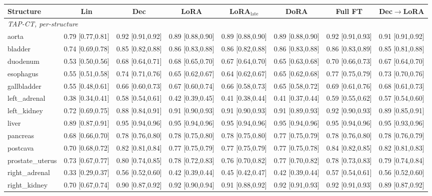 \begin{tabular}{lccccccc}
\toprule
Structure & Lin & Dec & LoRA & LoRA$_{\text{late}}$ & DoRA & Full FT & Dec$\to$LoRA \\
\midrule
\multicolumn{8}{l}{\textit{TAP-CT, per-structure}} \\
aorta & 0.79 [0.77,0.81] & 0.92 [0.91,0.92] & 0.89 [0.88,0.90] & 0.89 [0.88,0.90] & 0.89 [0.88,0.90] & 0.92 [0.91,0.93] & 0.91 [0.91,0.92] \\
bladder & 0.74 [0.69,0.78] & 0.85 [0.82,0.88] & 0.86 [0.83,0.88] & 0.86 [0.82,0.88] & 0.86 [0.83,0.88] & 0.86 [0.83,0.89] & 0.85 [0.81,0.88] \\
duodenum & 0.53 [0.50,0.56] & 0.68 [0.64,0.71] & 0.68 [0.65,0.70] & 0.67 [0.64,0.70] & 0.65 [0.63,0.68] & 0.70 [0.66,0.73] & 0.67 [0.64,0.70] \\
esophagus & 0.55 [0.51,0.58] & 0.74 [0.71,0.76] & 0.65 [0.62,0.67] & 0.64 [0.62,0.67] & 0.65 [0.62,0.68] & 0.77 [0.75,0.79] & 0.73 [0.70,0.76] \\
gallbladder & 0.55 [0.48,0.61] & 0.66 [0.60,0.73] & 0.67 [0.60,0.74] & 0.66 [0.58,0.73] & 0.65 [0.58,0.72] & 0.69 [0.61,0.76] & 0.68 [0.61,0.73] \\
left\_adrenal & 0.38 [0.34,0.41] & 0.58 [0.54,0.61] & 0.42 [0.39,0.45] & 0.41 [0.38,0.44] & 0.41 [0.37,0.44] & 0.59 [0.55,0.62] & 0.57 [0.54,0.60] \\
left\_kidney & 0.72 [0.69,0.75] & 0.88 [0.84,0.91] & 0.91 [0.90,0.93] & 0.91 [0.90,0.93] & 0.91 [0.89,0.93] & 0.92 [0.90,0.93] & 0.89 [0.85,0.91] \\
liver & 0.89 [0.87,0.91] & 0.95 [0.94,0.96] & 0.95 [0.94,0.96] & 0.95 [0.94,0.96] & 0.95 [0.94,0.96] & 0.95 [0.94,0.96] & 0.95 [0.93,0.96] \\
pancreas & 0.68 [0.66,0.70] & 0.78 [0.76,0.80] & 0.78 [0.75,0.80] & 0.78 [0.75,0.80] & 0.77 [0.75,0.79] & 0.78 [0.76,0.80] & 0.78 [0.76,0.79] \\
postcava & 0.70 [0.68,0.72] & 0.82 [0.81,0.84] & 0.77 [0.75,0.79] & 0.77 [0.75,0.79] & 0.77 [0.75,0.78] & 0.84 [0.82,0.85] & 0.82 [0.81,0.83] \\
prostate\_uterus & 0.73 [0.67,0.77] & 0.80 [0.74,0.85] & 0.78 [0.72,0.83] & 0.76 [0.70,0.82] & 0.77 [0.70,0.82] & 0.78 [0.73,0.83] & 0.79 [0.74,0.84] \\
right\_adrenal & 0.33 [0.29,0.37] & 0.56 [0.52,0.60] & 0.42 [0.39,0.44] & 0.45 [0.42,0.47] & 0.42 [0.39,0.44] & 0.57 [0.54,0.61] & 0.56 [0.52,0.60] \\
right\_kidney & 0.70 [0.67,0.74] & 0.90 [0.87,0.92] & 0.92 [0.90,0.94] & 0.91 [0.88,0.92] & 0.92 [0.91,0.93] & 0.92 [0.91,0.93] & 0.89 [0.87,0.92] \\

\end{tabular}
